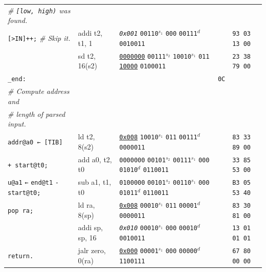 \documentclass[a4paper,12pt,final]{article}
\begin{document}
\begin{table}[!htbp]
\begin{adjustwidth}{-1cm}{-1cm}
\begin{center}
\begin{tabular}{l|ll|l|l}
\hspace{1.053000em} \emph{\# \texttt{[low, high)} was found.} &  &  &  & \\[0pt]
\hspace{1.053000em} \texttt{[>IN]++;}  \emph{\# Skip it.} & addi t2, t1, 1 & \emph{\texttt{0x001}}                    \texttt{00110}​\(^{s_{1}}\) \texttt{000} \texttt{00111}​\(^{d}\)  \texttt{0010011} &  & \texttt{93 03 13 00}\\[0pt]
\hspace{1.053000em} & sd t2, 16(s2) & \uline{\texttt{0000000}} \texttt{00111}​\(^{s_{2}}\) \texttt{10010}​\(^{s_{1}}\) \texttt{011} \uline{\texttt{10000}} \texttt{0100011} &  & \texttt{23 38 79 00}\\[0pt]
\texttt{\_end:} &  &  & \texttt{0C} & \\[0pt]
\hspace{1.053000em} \emph{\# Compute address and} &  &  &  & \\[0pt]
\hspace{1.053000em} \emph{\# length of parsed input.} &  &  &  & \\[0pt]
\hspace{1.053000em} \texttt{addr@a0 ← [TIB]} & ld t2, 8(s2) & \uline{\texttt{0x008}}                    \texttt{10010}​\(^{s_{1}}\) \texttt{011} \texttt{00111}​\(^{d}\)  \texttt{0000011} &  & \texttt{83 33 89 00}\\[0pt]
\hspace{5.265000em}         \texttt{+ start@t0;} & add a0, t2, t0 & \texttt{0000000} \texttt{00101}​\(^{s_{2}}\) \texttt{00111}​\(^{s_{1}}\) \texttt{000} \texttt{01010}​\(^{d}\)  \texttt{0110011} &  & \texttt{33 85 53 00}\\[0pt]
\hspace{1.053000em} \texttt{u@a1} \texttt{←} \texttt{end@t1} \texttt{-} \texttt{start@t0;} & sub a1, t1, t0 & \texttt{0100000} \texttt{00101}​\(^{s_{2}}\) \texttt{00110}​\(^{s_{1}}\) \texttt{000} \texttt{01011}​\(^{d}\)  \texttt{0110011} &  & \texttt{B3 05 53 40}\\[0pt]
\hspace{1.053000em} \texttt{pop ra;} & ld ra, 8(sp) & \uline{\texttt{0x008}}                    \texttt{00010}​\(^{s_{1}}\) \texttt{011} \texttt{00001}​\(^{d}\)  \texttt{0000011} &  & \texttt{83 30 81 00}\\[0pt]
\hspace{1.053000em} & addi sp, sp, 16 & \emph{\texttt{0x010}}                    \texttt{00010}​\(^{s_{1}}\) \texttt{000} \texttt{00010}​\(^{d}\)  \texttt{0010011} &  & \texttt{13 01 01 01}\\[0pt]
\hspace{1.053000em} \texttt{return.} & jalr zero, 0(ra) & \uline{\texttt{0x000}}                    \texttt{00001}​\(^{s_{1}}\) \texttt{000} \texttt{00000}​\(^{d}\)  \texttt{1100111} &  & \texttt{67 80 00 00}\\[0pt]
\end{tabular}


\end{center}
\end{adjustwidth}
\end{table}
\end{document}

